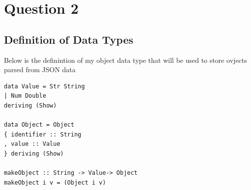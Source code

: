 \documentclass[a4paper]{article}
\begin{document}
\section{Question 2}
\subsection{Definition of Data Types}
Below is the definintion of my object data type that will be used to store ovjects parsed from JSON data

\begin{lstlisting}[frame=single]
data Value = Str String
| Num Double
deriving (Show)

data Object = Object 
{ identifier :: String
, value :: Value
} deriving (Show)

makeObject :: String -> Value-> Object
makeObject i v = (Object i v)
\end{lstlisting}
\end{document}
